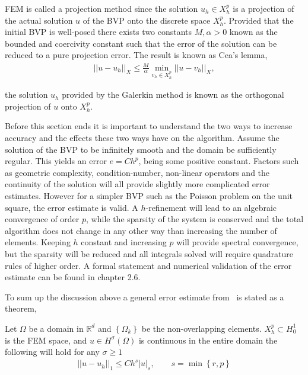 FEM is called a projection method since the solution $u_h\in X_h^p$ is a projection
of the actual solution $u$ of the BVP onto the discrete space $X_h^p$. Provided that the initial BVP is well-posed there exists two 
constants $M,\alpha>0$ known as the bounded and coercivity constant such that the error of the solution can be reduced to a pure 
projection error. The result is known as Cea's lemma,  
\begin{align}
    ||u-u_h||_X \leq \frac{M}{\alpha}\min_{v_h\in X_h^p}||u-v_h||_X,
    \label{eq:Cea}
\end{align}

the solution $u_h$ provided by the Galerkin method is known as the orthogonal projection of $u$ onto $X_h^p$. 

Before this section ends it is important to understand the two ways to increase accuracy and the effects these two ways have on the algorithm. 
Assume the solution of the BVP to be infinitely smooth and the domain be sufficiently regular. 
This yields an error $e = Ch^p$, being some positive constant.
Factors such as geometric complexity, condition-number, non-linear operators and the continuity of the 
solution will all provide slightly more complicated error estimates. 
However for a simpler BVP such as the Poisson problem on the unit square, the error estimate is valid.  
A $h$-refinement will lead to an algebraic convergence of order $p$, while the sparsity of the system is conserved
and the total algorithm does not change in any other way than increasing the number of elements.
Keeping $h$ constant and increasing $p$ will provide spectral convergence, but the sparsity will be reduced and all integrals solved will require 
quadrature rules of higher order. A formal statement and numerical validation of the error estimate can be found in \cite{Karniadakis} chapter 2.6.  

To sum up the discussion above a general error estimate from~\cite{Quarteroni} is stated as a theorem, 
\begin{theorem}
    Let $\Omega$ be a domain in $\mathbb{R}^d$ and $\left\{ \Omega_k \right\}$ 
    be the non-overlapping elements. $X_h^p \subset H^1_0$ is the FEM space, and $u \in H^{\sigma}(\Omega)$ is continuous 
    in the entire domain the following will hold for any $\sigma \ge 1$
\begin{align}
    ||u-u_h||_1 \le Ch^{s} |u|_{s},\qquad s = \min\left\{ r,p \right\}
\end{align}
    \label{thm:femconvergence}
\end{theorem}
%

